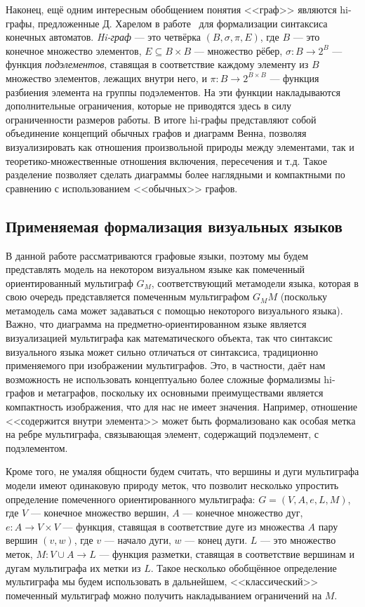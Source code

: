 Наконец, ещё одним интересным обобщением понятия <<граф>> являются hi-графы, предложенные
Д. Харелом в работе~\cite{harel1988higraph} для формализации синтаксиса конечных автоматов.
\textit{Hi-граф} --- это четвёрка $(B, \sigma, \pi, E)$, где $B$ --- это конечное множество
элементов, $E \subseteq B \times B$ --- множество рёбер, $\sigma: B \rightarrow 2^B$ ---
функция \textit{подэлементов}, ставящая в соответствие каждому элементу из $B$ множество
элементов, лежащих внутри него, и $\pi: B \rightarrow 2^{B \times B}$ --- функция разбиения 
элемента на группы подэлементов. На эти функции накладываются дополнительные ограничения,
которые не приводятся здесь в силу ограниченности размеров работы. В итоге hi-графы представляют
собой объединение концепций обычных графов и диаграмм Венна, позволяя визуализировать 
как отношения произвольной природы между элементами, так и теоретико-множественные отношения
включения, пересечения и т.д. Такое разделение позволяет сделать диаграммы более наглядными и
компактными по сравнению с использованием <<обычных>> графов.

\subsection{Применяемая формализация визуальных языков}
В данной работе рассматриваются графовые языки, поэтому мы будем представлять модель 
на некотором визуальном языке как помеченный ориентированный мультиграф $G_M$, соответствующий метамодели 
языка, которая в свою очередь представляется помеченным мультиграфом $G_MM$ (поскольку
метамодель сама может задаваться с помощью некоторого визуального языка). Важно, что диаграмма 
на предметно-ориентированном языке является визуализацией мультиграфа как математического 
объекта, так что синтаксис визуального языка может сильно отличаться от синтаксиса, 
традиционно применяемого при изображении мультиграфов. Это, в частности, даёт нам возможность
не использовать концептуально более сложные формализмы hi-графов и метаграфов, поскольку их
основными преимуществами является компактность изображения, что для нас не имеет значения.
Например, отношение <<содержится внутри элемента>> может быть формализовано как особая метка на
ребре мультиграфа, связывающая элемент, содержащий подэлемент, с подэлементом.

Кроме того, не умаляя общности будем считать, что вершины и дуги мультиграфа модели имеют 
одинаковую природу меток, что позволит несколько упростить определение помеченного 
ориентированного мультиграфа: $G = (V, A, e, L, M)$, где $V$ --- конечное множество вершин,
$A$ --- конечное множество дуг, $e: A \rightarrow V \times V$ --- функция, ставящая в соответствие
дуге из множества $A$ пару вершин $(v, w)$, где $v$ --- начало дуги, $w$ --- конец дуги.
$L$ --- это множество меток, $M: V \cup A \rightarrow L$ --- функция разметки, ставящая
в соответствие вершинам и дугам мультиграфа их метки из $L$. Такое несколько обобщённое определение 
мультиграфа мы будем использовать в дальнейшем, <<классический>> помеченный мультиграф
можно получить накладыванием ограничений на $M$.

